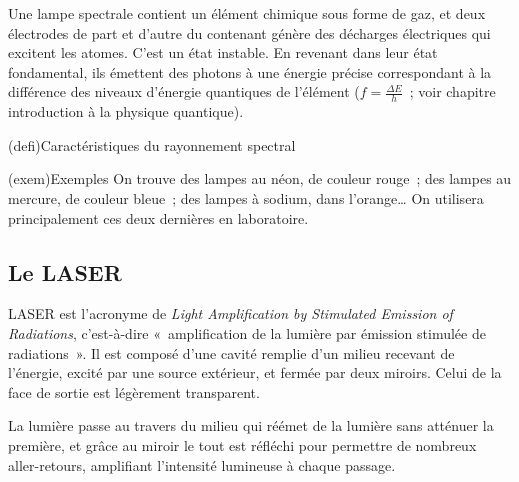 \documentclass[../../main/main.tex]{subfiles}
\begin{document}
Une lampe spectrale contient un élément chimique sous forme de gaz, et deux
électrodes de part et d'autre du contenant génère des décharges électriques qui
excitent les atomes. C'est un état instable. En revenant dans leur état
fondamental, ils émettent des photons à une énergie précise correspondant à la
différence des niveaux d'énergie quantiques de l'élément ($f = \frac{\Delta
		E}{h}$~; voir chapitre introduction à la physique quantique).

\begin{tcb*}(defi){Caractéristiques du rayonnement spectral}
\end{tcb*}
\begin{tcb*}[sidebyside, righthand width=.5\linewidth](exem){Exemples}
	On trouve des lampes au néon, de couleur rouge~; des lampes au mercure, de
	couleur bleue~; des lampes à sodium, dans l'orange… On utilisera
	principalement ces deux dernières en laboratoire.
	\tcblower
	\begin{center}
		\pgfspectra[element=Hg,
		axis, axis color=white, axis font color=black,
		axis ticks=4, axis unit precision=2,
		axis label text={Longueur d'onde [$\si{nm}$]},
		back=white,
		label, label position=north west,
		label before text=Spectre d'émission de~,
		label after text=\ :]
		\label{fig:lamp_spec}
	\end{center}
\end{tcb*}

\subsection{Le LASER}
LASER est l'acronyme de \textit{Light Amplification by Stimulated Emission of
	Radiations}, c'est-à-dire «~amplification de la lumière par émission stimulée de
radiations~». Il est composé d'une cavité remplie d'un milieu recevant de
l'énergie, excité par une source extérieur, et fermée par deux miroirs. Celui de
la face de sortie est légèrement transparent.

La lumière passe au travers du milieu qui réémet de la lumière sans atténuer la
première, et grâce au miroir le tout est réfléchi pour permettre de nombreux
aller-retours, amplifiant l'intensité lumineuse à chaque passage.
\end{document}
